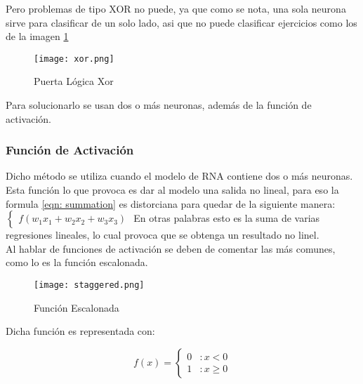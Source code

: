         Pero problemas de tipo XOR no puede, ya que como se nota, una sola neurona sirve para 
        clasificar de un solo lado, asi que no puede clasificar ejercicios
        como los de la imagen \ref{fig:fig3}

        \begin{figure}[H]
            \centering
            \texttt{[image: xor.png]}
            \caption{Puerta L\'ogica Xor \cite{mcmahon2014}}
            \label{fig:fig3}
        \end{figure}

        Para solucionarlo se usan dos o m\'as neuronas, adem\'as de la funci\'on de activaci\'on.

            \subsubsection{Funci\'on de Activaci\'on} \label{sec: activation}
                Dicho m\'etodo se utiliza cuando el modelo de RNA contiene dos o m\'as neuronas.
                Esta funci\'on lo que provoca es dar al modelo una salida no lineal, para 
                eso la formula \eqref{eqn: summation} es distorciana para quedar de la siguiente 
                manera: 
                $\begin{cases}
                    f( w_1x_1 + w_2x_2 + w_3x_3 )
                \end{cases}$
                En otras palabras esto es la suma de varias regresiones lineales, lo cual provoca que se obtenga 
                un resultado no linel. \\
                Al hablar de funciones de activaci\'on se deben de comentar las m\'as comunes, como lo es la 
                funci\'on escalonada.
                
                \begin{figure}[H]
                    \centering
                    \texttt{[image: staggered.png]}
                    \caption{Funci\'on Escalonada}
                    \label{fig:fig4}
                \end{figure}

                Dicha funci\'on es representada con: 
                
                \[f(x) = \left\{ \begin{array}{lr} 0 & : x < 0\\ 1 & : x \ge 0 \end{array} \right. \]

